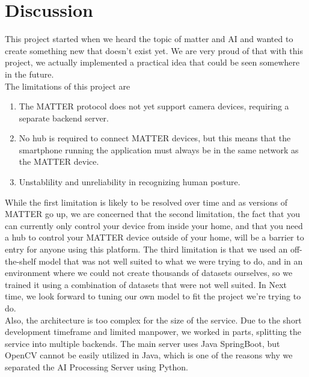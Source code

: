 

\clearpage
\section{\Large{Discussion}}

This project started when we heard the topic of matter and AI and wanted to create something new that doesn't exist yet. We are very proud of that with this project, we actually implemented a practical idea that could be seen somewhere in the future. \\

The limitations of this project are
\begin{enumerate}
    \item The MATTER protocol does not yet support camera devices, requiring a separate backend server.\\
    \item No hub is required to connect MATTER devices, but this means that the smartphone running the application must always be in the same network as the MATTER device. \\
    \item Unstablility and unreliability in recognizing human posture.\\
\end{enumerate}

While the first limitation is likely to be resolved over time and as versions of MATTER go up, we are concerned that the second limitation, the fact that you can currently only control your device from inside your home, and that you need a hub to control your MATTER device outside of your home, will be a barrier to entry for anyone using this platform. The third limitation is that we used an off-the-shelf model that was not well suited to what we were trying to do, and in an environment where we could not create thousands of datasets ourselves, so we trained it using a combination of datasets that were not well suited. In Next time, we look forward to tuning our own model to fit the project we're trying to do.\\

Also, the architecture is too complex for the size of the service. Due to the short development timeframe and limited manpower, we worked in parts, splitting the service into multiple backends. The main server uses Java SpringBoot, but OpenCV cannot be easily utilized in Java, which is one of the reasons why we separated the AI Processing Server using Python.\\

